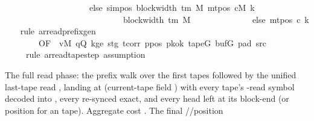 \begin{isabellebody}
\ \ \ \ \ \ \ \ \ \ \ \ \ \ \ \ \ \ \ \ else\ sim{\isacharunderscore}{\kern0pt}pos\ {\isacharparenleft}{\kern0pt}block{\isacharunderscore}{\kern0pt}width\ {\isacharparenleft}{\kern0pt}{\isasymGamma}{\isacharunderscore}{\kern0pt}tm\ M{\isacharparenright}{\kern0pt}{\isacharparenright}{\kern0pt}\ {\isacharparenleft}{\kern0pt}mt{\isacharunderscore}{\kern0pt}pos\ cM\ k{\isacharparenright}{\kern0pt}\isanewline
\ \ \ \ \ \ \ \ \ \ \ \ \ \ \ \ \ \ \ \ \ \ \ \ \ \ \ {\isacharplus}{\kern0pt}\ block{\isacharunderscore}{\kern0pt}width\ {\isacharparenleft}{\kern0pt}{\isasymGamma}{\isacharunderscore}{\kern0pt}tm\ M{\isacharparenright}{\kern0pt}{\isacharparenright}{\kern0pt}\isanewline
\ \ \ \ \ \ \ \ \ \ \ \ \ \ else\ mt{\isacharunderscore}{\kern0pt}pos\ c{}\ k{\isacharparenright}{\kern0pt}{\isacharparenright}{\kern0pt}{\isachardoublequoteclose}\isanewline
%
\isadelimproof
\ \ %
\endisadelimproof
%
\isatagproof
{}\isamarkupfalse%
\ {\isacharparenleft}{\kern0pt}rule\ ar{\isacharunderscore}{\kern0pt}read{\isacharunderscore}{\kern0pt}prefix{\isacharunderscore}{\kern0pt}gen\isanewline
\ \ \ \ \ \ \ \ {\isacharbrackleft}{\kern0pt}OF\ {\isacharunderscore}{\kern0pt}\ vM\ qQ\ kge{}\ stg{}\ tcorr\ ppos\ pkok\ tapeG\ bufG\ pad{}\ src{}{\isacharbrackright}{\kern0pt}{\isacharparenright}{\kern0pt}\isanewline
\ \ \ \ \ {\isacharparenleft}{\kern0pt}rule\ ar{\isacharunderscore}{\kern0pt}read{\isacharunderscore}{\kern0pt}tape{\isacharunderscore}{\kern0pt}step{\isacharsemicolon}{\kern0pt}\ assumption{\isacharparenright}{\kern0pt}%
\endisatagproof
{\isafoldproof}%
%
\isadelimproof
%
\endisadelimproof
%
\begin{isamarkuptext}%
The full read phase: the prefix walk over the first
   tapes followed by the unified last-tape read
  , landing at 
  (current-tape field ) with every tape's
  -read symbol decoded into , every 
  re-synced exact, and every head left at its block-end (or position
   for an  tape).  Aggregate cost .  The final //position

\end{isamarkuptext}
\end{isabellebody}
